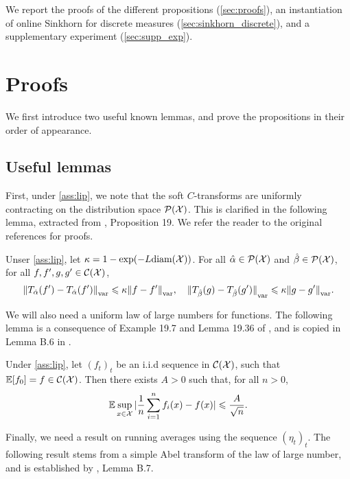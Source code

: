 We report the proofs of the different propositions (\autoref{sec:proofs}), an instantiation of online Sinkhorn for discrete measures (\autoref{sec:sinkhorn_discrete}), and a supplementary experiment (\autoref{sec:supp_exp}).

\section{Proofs}\label{sec:proofs}

We first introduce two useful known lemmas, and prove the propositions in their order of appearance.

\subsection{Useful lemmas}

First, under \autoref{ass:lip}, we note that the soft $C$-transforms are
 uniformly contracting on the distribution space $\mathcal{P}(\mathcal{X})$. This is clarified
 in the following lemma, extracted from \citet{vialard2019elementary},
 Proposition 19. We refer the reader to the original references for proofs.

\begin{lemma}\label{lemma:contractance}
    Unser \autoref{ass:lip}, let $\kappa = 1 - \exp(-L
    \textnormal{diam}(\mathcal{X}))$. For all $\hat \alpha \in \mathcal{P}(\mathcal{X})$ and $\hat \beta \in
    \mathcal{P}(\mathcal{X})$, for all $f, f', g, g' \in \mathcal{C}(\mathcal{X})$,
    \begin{equation}
        {\Vert T_{\hat \alpha}(f') - 
        T_{\hat \alpha}(f') \Vert}_{\text{\upshape var}} \leqslant \kappa {\Vert f - f' \Vert}_{\text{\upshape var}},
        \quad
        {\Vert T_{\hat \beta}(g) - 
        T_{\hat \beta}(g') \Vert}_{\text{\upshape var}} \leqslant \kappa {\Vert g - g' \Vert}_{\text{\upshape var}}.
    \end{equation}
\end{lemma}

We will also need a uniform law of large numbers for functions. The following lemma is a consequence of Example 19.7 and
Lemma 19.36 of \citet{van_der_vaart_asymptotic_2000}, and is copied in Lemma B.6 in \citet{mairal_stochastic_2013}.

\begin{lemma}\label{lemma:lln}
    Under \autoref{ass:lip}, let $(f_t)_t$ be an i.i.d sequence in $\mathcal{C}(\mathcal{X})$,
    such that $\mathbb{E}[f_0] = f \in \mathcal{C}(\mathcal{X})$. Then there exists $A > 0$ such that, for all $n > 0$,
    \begin{equation}
        \mathbb{E} \sup_{x \in \mathcal{X}} | \frac{1}{n} \sum_{i=1}^n f_i(x) - f(x) |
        \leqslant \frac{A}{\sqrt{n}}.
    \end{equation}
\end{lemma}
Finally, we need a result on running averages using the sequence ${(\eta_t)}_t$. The following result stems from a simple Abel transform of the law of large number, and is established by \citet{mairal_stochastic_2013}, Lemma B.7.

